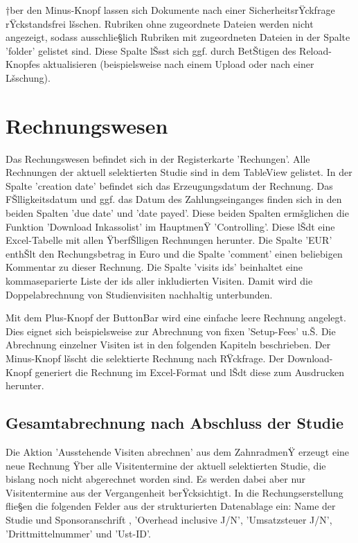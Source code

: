 \documentclass[11pt,oneside]{scrbook}
\begin{document}
†ber den Minus-Knopf lassen sich Dokumente nach einer SicherheitsrŸckfrage rŸckstandsfrei lšschen. Rubriken ohne zugeordnete Dateien werden nicht angezeigt, sodass ausschlie§lich Rubriken mit zugeordneten Dateien in der Spalte 'folder' gelistet sind. Diese Spalte lŠsst sich ggf. durch BetŠtigen des Reload-Knopfes aktualisieren (beispielsweise nach einem Upload oder nach einer Lšschung).

\chapter{Rechnungswesen}
\label{chap:rechnung}
Das Rechungswesen befindet sich in der Registerkarte 'Rechungen'. Alle Rechnungen der aktuell selektierten Studie sind in dem TableView gelistet. In der Spalte 'creation date' befindet sich das Erzeugungsdatum der Rechnung. Das FŠlligkeitsdatum und ggf. das Datum des Zahlungseinganges finden sich in den beiden Spalten 'due date' und 'date payed'. Diese beiden Spalten ermšglichen  die Funktion 'Download Inkassolist' im HauptmenŸ 'Controlling'. Diese lŠdt eine Excel-Tabelle mit allen ŸberfŠlligen Rechnungen herunter. Die Spalte 'EUR' enthŠlt den Rechungsbetrag in Euro und die Spalte 'comment' einen beliebigen Kommentar zu dieser Rechnung. Die Spalte 'visits ids' beinhaltet eine kommaseparierte Liste der ids aller inkludierten Visiten. Damit wird die Doppelabrechnung von Studienvisiten nachhaltig unterbunden.

Mit dem Plus-Knopf der ButtonBar wird eine einfache leere Rechnung angelegt. Dies eignet sich beispielsweise zur Abrechnung von fixen 'Setup-Fees' u.Š. Die Abrechnung einzelner Visiten ist in den folgenden Kapiteln beschrieben. Der Minus-Knopf lšscht die selektierte Rechnung nach RŸckfrage. Der Download-Knopf generiert die Rechnung im Excel-Format und lŠdt diese zum Ausdrucken herunter.  

\section{Gesamtabrechnung nach Abschluss der Studie}
Die Aktion 'Ausstehende Visiten abrechnen' aus dem ZahnradmenŸ erzeugt eine neue Rechnung Ÿber alle Visitentermine der aktuell selektierten Studie, die bislang noch nicht abgerechnet worden sind. Es werden dabei aber nur Visitentermine aus der Vergangenheit berŸcksichtigt. In die Rechungserstellung flie§en die folgenden Felder aus der strukturierten Datenablage ein:  Name der Studie und Sponsoranschrift , 'Overhead inclusive J/N', 'Umsatzsteuer J/N', 'Drittmittelnummer' und 'Ust-ID'.
\end{document}
